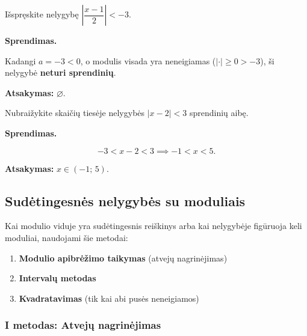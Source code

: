 \begin{example}
Išspręskite nelygybę $\left|\dfrac{x-1}{2}\right| < -3$.

\textbf{Sprendimas.}

Kadangi $a = -3 < 0$, o modulis visada yra neneigiamas ($|\cdot| \geq 0 > -3$), ši nelygybė \textbf{neturi sprendinių}.

\textbf{Atsakymas:} $\varnothing$.
\end{example}

\begin{example}
Nubraižykite skaičių tiesėje nelygybės $|x - 2| < 3$ sprendinių aibę.

\textbf{Sprendimas.}

\[
-3 < x - 2 < 3 \implies -1 < x < 5.
\]

\begin{center}
\end{center}

\textbf{Atsakymas:} $x \in (-1;\, 5)$.
\end{example}

\subsection{Sudėtingesnės nelygybės su moduliais}

Kai modulio viduje yra sudėtingesnis reiškinys arba kai nelygybėje figūruoja keli moduliai, naudojami šie metodai:

\begin{enumerate}[label=\textbf{\Roman*.}]
  \item \textbf{Modulio apibrėžimo taikymas} (atvejų nagrinėjimas)
  \item \textbf{Intervalų metodas}
  \item \textbf{Kvadratavimas} (tik kai abi pusės neneigiamos)
\end{enumerate}

\subsubsection*{I metodas: Atvejų nagrinėjimas}

